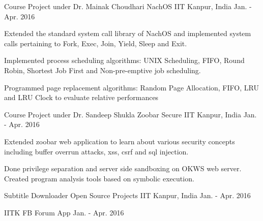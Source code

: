 \begin{cventries}
	\cventry
	{Course Project under Dr. Mainak Choudhari} %
	{NachOS} %
	{IIT Kanpur, India} %
	{Jan. - Apr. 2016} %
	{
		\begin{cvitems} %
			\item Extended the standard system call library of NachOS and implemented system calls pertaining to Fork, Exec, Join, Yield, Sleep and Exit.
			\item Implemented process scheduling algorithms: UNIX Scheduling, FIFO, Round Robin, Shortest Job First and Non-pre-emptive job scheduling.
			\item Programmed page replacement algorithms: Random Page Allocation, FIFO, LRU and LRU Clock to evaluate relative performances
		\end{cvitems}
	}
	\cventry
	{Course Project under Dr. Sandeep Shukla} %
	{Zoobar Secure} %
	{IIT Kanpur, India} %
	{Jan. - Apr. 2016} %
	{
		\begin{cvitems} %
			\item Extended zoobar web application to learn about various security concepts including buffer overrun attacks, xss, csrf and sql injection.
			\item Done privilege separation and server side sandboxing on OKWS web server. Created program analysis tools based on symbolic execution.
		\end{cvitems}
	}
	
	\cventry
	{Subtitle Downloader} %
	{Open Source Projects} %
	{IIT Kanpur, India} %
	{Jan. - Apr. 2016} %
	{
		\begin{cvitems} %
		\end{cvitems}
	}
	
	\cventry
	{IITK FB Forum App} %
	{} %
	{} %
	{Jan. - Apr. 2016} %
	{
		\begin{cvitems} %
		\end{cvitems}
	}
\end{cventries}